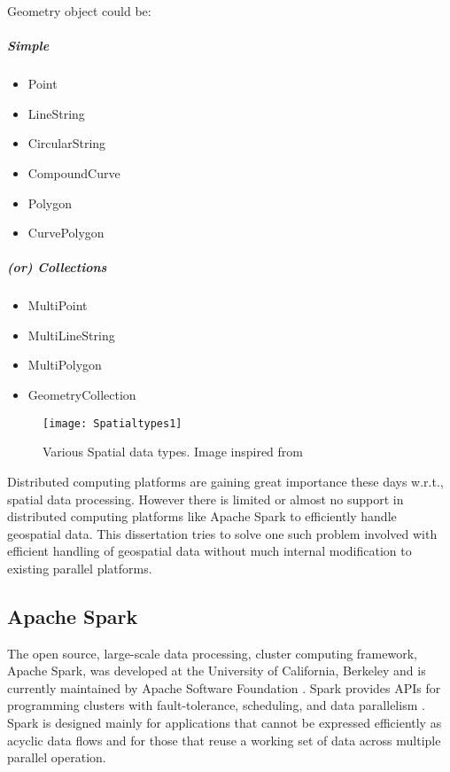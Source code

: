 \documentclass[article,type=msc,colorback,12pt,accentcolor=tud1d]{tudthesis}
\begin{document}
			   Geometry object could be: \cite{spatialdatatypes}
			 \subparagraph{Simple}
			 \begin{itemize}
				   \item  Point
				   \item  LineString
				   \item  CircularString
				   \item  CompoundCurve
				   \item  Polygon
				   \item  CurvePolygon
			 \end{itemize}
			  \subparagraph{(or) Collections}
			  \begin{itemize}
				  	\item  MultiPoint
				    \item  MultiLineString
				    \item  MultiPolygon
				    \item  GeometryCollection
			  \end{itemize}
			  
			   \begin{figure}[h]
				   	\centering
				   	\texttt{[image: Spatialtypes1]}
				   	\caption{Various Spatial data types. Image inspired from \cite{spatialdatatypes}  }
				   	\label{fig:spatialdatatypes}
			   \end{figure}
			  
			   Distributed computing platforms are gaining great importance these days w.r.t., spatial data processing. However there is limited or almost no support in distributed computing platforms like Apache Spark to efficiently handle geospatial data. This dissertation tries to solve one such problem involved with efficient handling of geospatial data without much internal modification to existing parallel platforms.
			   
			   \clearpage
		   \subsection{Apache Spark}
		   
		   \par The open source, large-scale data processing, cluster computing framework, Apache Spark\cite{sparkmainpaper}, was developed at the University of California, Berkeley and is currently maintained by Apache Software Foundation \cite{sparkHomePage} . Spark provides APIs for programming clusters with fault-tolerance, scheduling, and data parallelism \cite{wiki:spark}. Spark is designed mainly for applications that cannot be expressed efficiently as acyclic data flows and for those that reuse a working set of data across multiple parallel operation. 
		   
\end{document}
